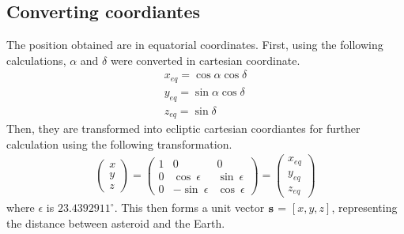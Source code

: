 \documentclass[a4paper,12pt]{article}
\begin{document}
\subsection{Converting coordiantes}
\label{sec:coordinates}
The position obtained are in equatorial coordinates. First, using the following calculations, $\alpha$ and $\delta$ were converted in cartesian coordinate. 
\begin{equation}
\label{eq:xyz}
\begin{array}{lll}

x_{eq} = \cos \alpha \cos \delta \\
y_{eq} = \sin \alpha \cos \delta \\
z_{eq} = \sin \delta 

\end{array}
\end{equation}
Then, they are transformed into ecliptic cartesian coordiantes for further calculation using the following transformation.
\begin{equation}
\label{eq:conversion}
\begin{array}{rcl}
    \begin{pmatrix}
        x\\ 
        y\\ 
        z
    \end{pmatrix}
=   \begin{pmatrix}
       1 & 0 & 0\\ 
        0& \cos\ \epsilon & \sin\ \epsilon \\ 
        0 & -\sin\ \epsilon & \cos\ \epsilon 
    \end{pmatrix}
=   \begin{pmatrix}
        x_{eq}\\ 
        y_{eq}\\ 
        z_{eq}
    \end{pmatrix}
\end{array}
\end{equation}
where $\epsilon$ is $23.4392911^{\circ}$. This then forms a unit vector $\bf{s}$ = $[x,y,z]$, representing the distance between asteroid and the Earth.
\end{document}
